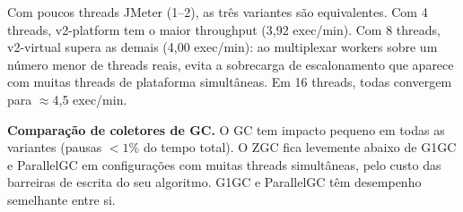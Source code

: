 Com poucos threads JMeter (1--2), as três variantes são equivalentes. Com 4
threads, v2-platform tem o maior throughput (3,92 exec/min). Com 8 threads,
v2-virtual supera as demais (4,00 exec/min): ao multiplexar workers sobre um
número menor de threads reais, evita a sobrecarga de escalonamento que aparece
com muitas threads de plataforma simultâneas. Em 16 threads, todas convergem
para $\approx$4,5 exec/min.

\textbf{Comparação de coletores de GC.}
O GC tem impacto pequeno em todas as variantes (pausas $< 1\%$ do tempo total).
O ZGC fica levemente abaixo de G1GC e ParallelGC em configurações com muitas
threads simultâneas, pelo custo das barreiras de escrita do seu algoritmo.
G1GC e ParallelGC têm desempenho semelhante entre si.
